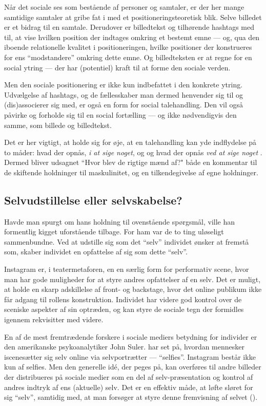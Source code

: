 Når det sociale ses som bestående af personer og samtaler, er der 
her mange samtidige samtaler at gribe fat i med et 
positioneringsteoretisk blik. Selve billedet er et bidrag til en 
samtale. Derudover er billedtekst og tilhørende hashtags med til, 
at vise hvilken position der indtages omkring et bestemt emne — 
og, qua den iboende relationelle kvalitet i positioneringen, 
hvilke positioner der konstrueres for ens “modstandere” omkring 
dette emne. Og billedteksten er at regne for en social ytring — 
der har (potentiel) kraft til at forme den sociale verden.

Men den sociale positionering er ikke kun indbefattet i den 
konkrete ytring. Udvælgelse af hashtags, og de fællesskaber man 
dermed henvender sig til og (dis)associerer sig med, er også en 
form for social talehandling. Den vil også påvirke og forholde sig 
til en social fortælling — og ikke nødvendigvis den samme, som 
billede og billedtekst.

Det er her vigtigt, at holde sig for øje, at en talehandling kan 
yde indflydelse på to måder: hvad der opnås, \emph{i at sige 
noget}, og og hvad der opnås \emph{ved at sige noget} \autocite[s.
17]{harrePositioningTheoryMoral1999}. Dermed bliver udsagnet “Hvor
blev de rigtige mænd af?" både en kommentar til de skiftende 
holdninger til maskulinitet, og en tilkendegivelse af egne 
holdninger.

\subsection{Selvudstillelse eller selvskabelse?}

Havde man spurgt \citeauthor{goffmanPresentationSelfEveryday1956} 
om hans holdning til ovenstående spørgsmål, ville han formentlig 
kigget uforstående tilbage. For ham var de to ting uløseligt 
sammenbundne. Ved at udstille sig som det “selv” individet ønsker 
at fremstå som, skaber individet en opfattelse af sig som dette 
“selv”.

Instagram er, i teatermetaforen, en en særlig form for performativ 
scene, hvor man har gode muligheder for at styre andres 
opfattelser af en selv. Det er muligt, at holde en skarp 
adskillelse af front- og backstage, hvor det online publikum ikke 
får adgang til rollens konstruktion. Individet har videre god 
kontrol over de sceniske aspekter af sin optræden, og kan styre de 
sociale tegn der formidles igennem rekvisitter med videre. 

En af de mest fremtrædende forskere i sociale mediers betydning
for individer er den amerikanske psykoanalytiker John Suler. 
\citeauthor{sulerSelfPortraitsSelfies2015} har set på, hvordan 
mennesker iscenesætter sig selv online via selvportrætter — 
“selfies”. Instagram består ikke kun af selfies. Men den generelle 
idé, der peges på, kan overføres til andre billeder der 
distribueres på sociale medier som en del af selv-præsentation og
kontrol af andres indtryk af ens (aktuelle) selv. Det er en
effektiv måde, at løfte sløret for sig “selv”, samtidig med, at
man forsøger at styre denne fremvisning af selvet 
(\citeyear{sulerSelfPortraitsSelfies2015}).

